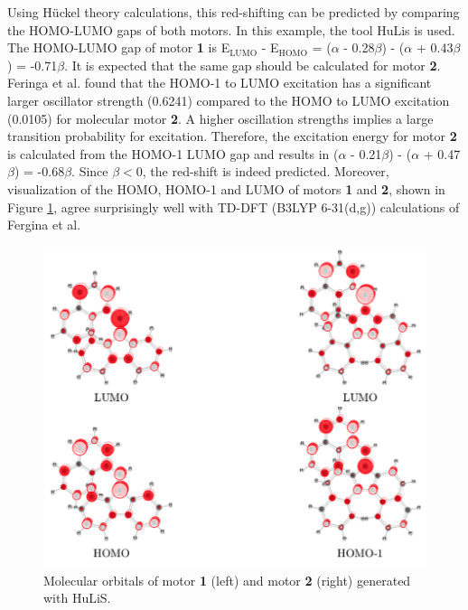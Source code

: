 \documentclass{article}
\begin{document}
Using H\"uckel theory calculations, this red-shifting can be predicted by comparing the HOMO-LUMO gaps of both motors. In this example, the tool HuLis is used.\cite{Carissan2008, hulis} The HOMO-LUMO gap of motor \textbf{1} is E$_\text{LUMO}$ - E$_\text{HOMO}$ = ($\alpha$ - 0.28$\beta$) - ($\alpha$ + 0.43$\beta$) = -0.71$\beta$. It is expected that the same gap should be calculated for motor \textbf{2}. Feringa et al. found that the HOMO-1 to LUMO excitation has a significant larger oscillator strength (0.6241) compared to the HOMO to LUMO excitation (0.0105) for molecular motor \textbf{2}. A higher oscillation strengths implies a large transition probability for excitation. Therefore, the excitation energy for motor \textbf{2} is calculated from the HOMO-1 LUMO gap and results in ($\alpha$ - 0.21$\beta$) - ($\alpha$ + 0.47$\beta$) = -0.68$\beta$. Since $\beta {<} 0$, the red-shift is indeed predicted. Moreover, visualization of the HOMO, HOMO-1 and LUMO of motors \textbf{1} and \textbf{2}, shown in Figure \ref{fig:hulis_orbitals}, agree surprisingly well with TD-DFT (B3LYP 6-31(d,g)) calculations of Fergina et al.

\begin{figure}[h]
\centering
\includegraphics[scale=0.75]{./images/hulis_mm.png}
\caption{Molecular orbitals of motor \textbf{1} (left) and motor \textbf{2} (right) generated with HuLiS.}
\label{fig:hulis_orbitals}
\end{figure} 

               
    
\end{document}
